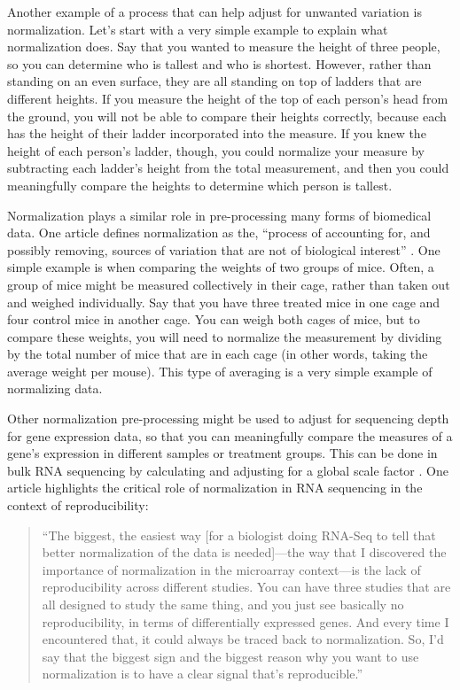 \documentclass[]{tufte-book}
\begin{document}
Another example of a process that can help adjust for unwanted variation is
normalization. Let's start with a very simple example to explain what
normalization does. Say that you wanted to measure the height of three people,
so you can determine who is tallest and who is shortest. However, rather than
standing on an even surface, they are all standing on top of ladders that are
different heights. If you measure the height of the top of each person's head
from the ground, you will not be able to compare their heights correctly,
because each has the height of their ladder incorporated into the measure. If
you knew the height of each person's ladder, though, you could normalize your
measure by subtracting each ladder's height from the total measurement, and then
you could meaningfully compare the heights to determine which person is tallest.

Normalization plays a similar role in pre-processing many forms of biomedical
data. One article defines normalization as the, ``process of accounting for, and
possibly removing, sources of variation that are not of biological interest''
\citep{mak2011john}. One simple example is when comparing the weights of two groups
of mice. Often, a group of mice might be measured collectively in their cage,
rather than taken out and weighed individually. Say that you have three treated
mice in one cage and four control mice in another cage. You can weigh both cages
of mice, but to compare these weights, you will need to normalize the
measurement by dividing by the total number of mice that are in each cage (in
other words, taking the average weight per mouse). This type of averaging is a
very simple example of normalizing data.

Other normalization pre-processing might be used to adjust for sequencing depth
for gene expression data, so that you can meaningfully compare the measures of a
gene's expression in different samples or treatment groups.
This can be done in bulk RNA sequencing by calculating and adjusting for a
global scale factor \citep{bacher2017scnorm}. One article highlights the critical
role of normalization in RNA sequencing in the context of reproducibility:

\begin{quote}
``The biggest, the easiest way {[}for a biologist doing RNA-Seq to tell that
better normalization of the data is needed{]}---the way that I discovered the
importance of normalization in the microarray context---is the lack of
reproducibility across different studies. You can have three studies that are
all designed to study the same thing, and you just see basically no
reproducibility, in terms of differentially expressed genes. And every time I
encountered that, it could always be traced back to normalization. So, I'd say
that the biggest sign and the biggest reason why you want to use normalization
is to have a clear signal that's reproducible.'' \citep{mak2011john}
\end{quote}
\end{document}
